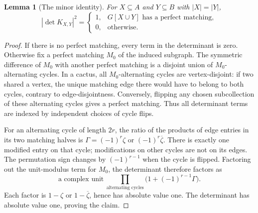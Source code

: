 \documentclass[11pt]{article}
\numberwithin{equation}{section}
\newtheorem{lemma}[theorem]{Lemma}
\theoremstyle{definition}
\begin{document}
\begin{lemma}[The minor identity]\label{htwo:lem:unitminor}
For $X\subseteq A$ and $Y\subseteq B$ with $|X|=|Y|$,
\begin{equation}
 |\det K_{X,Y}|^2=
 \begin{cases}
 1,&G[X\cup Y]\text{ has a perfect matching},\\
 0,&\text{otherwise}.
 \end{cases}
 \label{htwo:eq:unitminor}
\end{equation}
\end{lemma}
\begin{proof}
If there is no perfect matching, every term in the determinant is zero.
Otherwise fix a perfect matching $M_0$ of the induced subgraph. The
symmetric difference of $M_0$ with another perfect matching is a disjoint
union of $M_0$-alternating cycles. In a cactus, all $M_0$-alternating cycles
are vertex-disjoint: if two shared a vertex, the unique matching edge
there would have to belong to both cycles, contrary to edge-disjointness.
Conversely, flipping any chosen subcollection of these alternating cycles
gives a perfect matching. Thus all determinant terms are indexed by
independent choices of cycle flips.

For an alternating cycle of length $2r$, the ratio of the products of
edge entries in its two matching halves is
$\Gamma=(-1)^r\zeta$ or $(-1)^r\overline\zeta$. There is exactly one
modified entry on that cycle; modifications on other cycles are not on
its edges. The permutation sign changes by $(-1)^{r-1}$ when the cycle
is flipped. Factoring out the unit-modulus term for $M_0$, the determinant
therefore factors as
\[
 \text{a complex unit}\ \prod_{\text{alternating cycles}}
       \bigl(1+(-1)^{r-1}\Gamma\bigr).
\]
Each factor is $1-\zeta$ or $1-\overline\zeta$, hence has absolute value
one. The determinant has absolute value one, proving the claim.
\end{proof}
\end{document}
